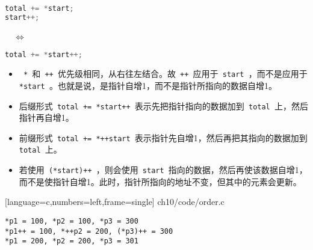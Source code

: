 \begin{frame}[fragile]
\begin{minipage}{0.4\textwidth}
\begin{lstlisting}[language=c,backgroundcolor=\color{red!20}]
total += *start;
start++;
\end{lstlisting}
\end{minipage}
~~$\Longleftrightarrow$~~
\begin{minipage}{0.4\textwidth}
\begin{lstlisting}[language=c,backgroundcolor=\color{red!20}]
total += *start++;
\end{lstlisting}
\end{minipage}
\begin{itemize}
\item
\lstinline| * |和\lstinline| ++ |优先级相同，从右往左结合。故\lstinline| ++ |应用于\lstinline| start |，而不是应用于\lstinline| *start |。也就是说，是指针自增1，而不是指针所指向的数据自增1。 \\[0.1in]\pause 
\item
后缀形式\lstinline| total += *start++ |表示先把指针指向的数据加到\lstinline| total |上，然后指针再自增1。\\[0.1in]\pause
\item
前缀形式\lstinline| total += *++start |表示指针先自增1，然后再把其指向的数据加到\lstinline| total |上。\\[0.1in]\pause
\item
若使用\lstinline| (*start)++ |，则会使用\lstinline| start |指向的数据，然后再使该数据自增1，而不是使指针自增1。此时，指针所指向的地址不变，但其中的元素会更新。
\end{itemize}
\end{frame}

\begin{frame}

[language=c,numbers=left,frame=single]
{ch10/code/order.c}
\end{frame}

\begin{frame}[fragile]
\begin{lstlisting}[backgroundcolor=\color{red!20}]
*p1 = 100, *p2 = 100, *p3 = 300
*p1++ = 100, *++p2 = 200, (*p3)++ = 300
*p1 = 200, *p2 = 200, *p3 = 301
\end{lstlisting}
\end{frame}

